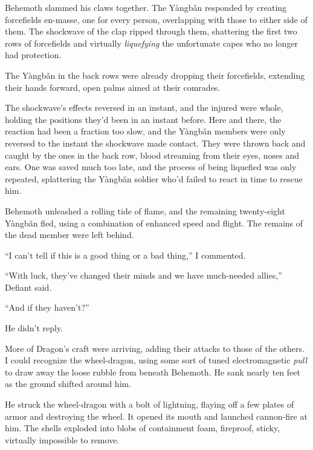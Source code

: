Behemoth slammed his claws together.  The Y\`{a}ngb\v{a}n responded by creating forcefields en-masse, one for every person, overlapping with those to either side of them.  The shockwave of the clap ripped through them, shattering the first two rows of forcefields and virtually \emph{liquefying }the unfortunate capes who no longer had protection.



The Y\`{a}ngb\v{a}n in the back rows were already dropping their forcefields, extending their hands forward, open palms aimed at their comrades.



The shockwave's effects reversed in an instant, and the injured were whole, holding the positions they'd been in an instant before.  Here and there, the reaction had been a fraction too slow, and the Y\`{a}ngb\v{a}n members were only reversed to the instant the shockwave made contact.  They were thrown back and caught by the ones in the back row, blood streaming from their eyes, noses and ears.  One was saved much too late, and the process of being liquefied was only repeated, splattering the Y\`{a}ngb\v{a}n soldier who'd failed to react in time to rescue him.



Behemoth unleashed a rolling tide of flame, and the remaining twenty-eight Y\`{a}ngb\v{a}n fled, using a combination of enhanced speed and flight.  The remains of the dead member were left behind.



``I can't tell if this is a good thing or a bad thing,'' I commented.



``With luck, they've changed their minds and we have much-needed allies,'' Defiant said.



``And if they haven't?''



He didn't reply.



More of Dragon's craft were arriving, adding their attacks to those of the others.  I could recognize the wheel-dragon, using some sort of tuned electromagnetic \emph{pull }to draw away the loose rubble from beneath Behemoth\emph{.  }He sank nearly ten feet as the ground shifted around him.



He struck the wheel-dragon with a bolt of lightning, flaying off a few plates of armor and destroying the wheel.  It opened its mouth and launched cannon-fire at him.  The shells exploded into blobs of containment foam, fireproof, sticky, virtually impossible to remove.



